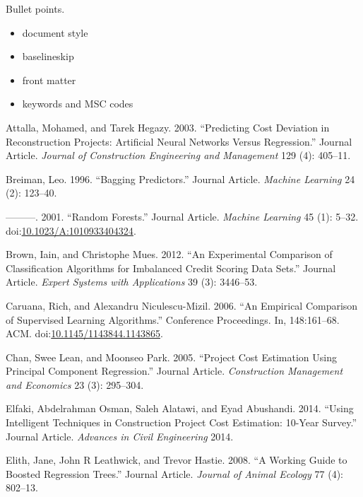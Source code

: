 \documentclass[]{elsarticle} %
\begin{document}
Bullet points.

\begin{itemize}
\item
  document style
\item
  baselineskip
\item
  front matter
\item
  keywords and MSC codes
\end{itemize}

\hypertarget{refs}{}
\hypertarget{ref-Attalla2003}{}
Attalla, Mohamed, and Tarek Hegazy. 2003. ``Predicting Cost Deviation in
Reconstruction Projects: Artificial Neural Networks Versus Regression.''
Journal Article. \emph{Journal of Construction Engineering and
Management} 129 (4): 405--11.

\hypertarget{ref-Breiman1996}{}
Breiman, Leo. 1996. ``Bagging Predictors.'' Journal Article.
\emph{Machine Learning} 24 (2): 123--40.

\hypertarget{ref-Breiman2001a}{}
---------. 2001. ``Random Forests.'' Journal Article. \emph{Machine
Learning} 45 (1): 5--32.
doi:\href{https://doi.org/10.1023/A:1010933404324}{10.1023/A:1010933404324}.

\hypertarget{ref-Brown2012}{}
Brown, Iain, and Christophe Mues. 2012. ``An Experimental Comparison of
Classification Algorithms for Imbalanced Credit Scoring Data Sets.''
Journal Article. \emph{Expert Systems with Applications} 39 (3):
3446--53.

\hypertarget{ref-Caruana2006}{}
Caruana, Rich, and Alexandru Niculescu-Mizil. 2006. ``An Empirical
Comparison of Supervised Learning Algorithms.'' Conference Proceedings.
In, 148:161--68. ACM.
doi:\href{https://doi.org/10.1145/1143844.1143865}{10.1145/1143844.1143865}.

\hypertarget{ref-Chan2005}{}
Chan, Swee Lean, and Moonseo Park. 2005. ``Project Cost Estimation Using
Principal Component Regression.'' Journal Article. \emph{Construction
Management and Economics} 23 (3): 295--304.

\hypertarget{ref-Elfaki2014}{}
Elfaki, Abdelrahman Osman, Saleh Alatawi, and Eyad Abushandi. 2014.
``Using Intelligent Techniques in Construction Project Cost Estimation:
10-Year Survey.'' Journal Article. \emph{Advances in Civil Engineering}
2014.

\hypertarget{ref-Elith2008}{}
Elith, Jane, John R Leathwick, and Trevor Hastie. 2008. ``A Working
Guide to Boosted Regression Trees.'' Journal Article. \emph{Journal of
Animal Ecology} 77 (4): 802--13.
\end{document}
